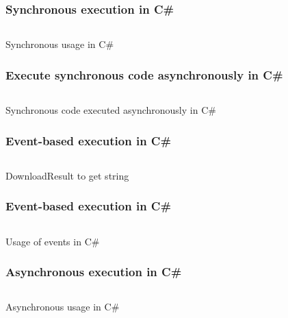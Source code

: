 \documentclass[11pt,t,usepdftitle=false,aspectratio=169,usenames,dvipsnames]{beamer}
\begin{document}
    \begin{frame}
        \frametitle{Synchronous execution in C\#}
        
        \begin{listing}[H]
            \inputminted[framesep=2mm, baselinestretch=1.2, fontsize=\scriptsize, linenos]{csharp}{codes/example_synchronous.cs}
            \caption{Synchronous usage in C\#}
            \label{listing:asynchronous-usage-in-csharp}
        \end{listing}
    \end{frame}

    \begin{frame}
        \frametitle{Execute synchronous code asynchronously in C\#}

        \begin{listing}[H]
            \inputminted[framesep=2mm, baselinestretch=1.2, fontsize=\scriptsize, linenos]{csharp}{codes/example_synchronous_code_asynchronously.cs}
            \caption{Synchronous code executed asynchronously in C\#}
            \label{listing:synchronous-code-executed-asynchronously-in-csharp}
        \end{listing}
    \end{frame}

    \begin{frame}
        \frametitle{Event-based execution in C\#}
        
        \begin{listing}[H]
            \inputminted[framesep=2mm, baselinestretch=1.2, fontsize=\scriptsize, linenos, lastline=15]{csharp}{codes/example_eventbased.cs}
            \caption{DownloadResult to get string}
            \label{listing:download-result-to-get-string}
        \end{listing}
    \end{frame}

    \begin{frame}
        \frametitle{Event-based execution in C\#}
        
        \begin{listing}[H]
            \inputminted[framesep=2mm, baselinestretch=1.2, fontsize=\scriptsize, linenos, firstline=17]{csharp}{codes/example_eventbased.cs}
            \caption{Usage of events in C\#}
            \label{listing:usage-of-events-in-csharp}
        \end{listing}
    \end{frame}

    \begin{frame}
        \frametitle{Asynchronous execution in C\#}

        \begin{listing}[H]
            \inputminted[framesep=2mm, baselinestretch=1.2, fontsize=\scriptsize, linenos]{csharp}{codes/example_asynchronous.cs}
            \caption{Asynchronous usage in C\#}
            \label{listing:asynchronous-usage-in-csharp}
        \end{listing}
    \end{frame}
\end{document}
